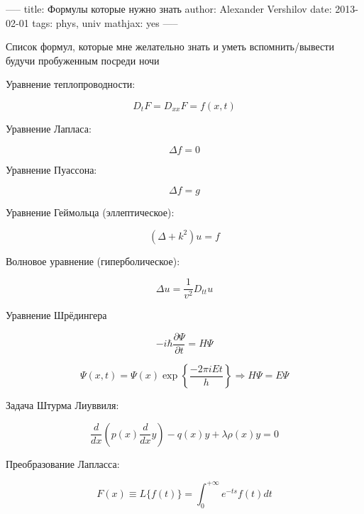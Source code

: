 -----
title: Формулы которые нужно знать
author: Alexander Vershilov
date: 2013-02-01
tags: phys, univ
mathjax: yes
-----


Список формул, которые мне желательно знать и уметь вспомнить/вывести будучи пробуженным посреди ночи

Уравнение теплопроводности:

$$ D_t F = D_{xx} F = f(x,t) $$

Уравнение Лапласа:

$$ \Delta f = 0 $$

Уравнение Пуассона:

$$ \Delta f = g $$

Уравнение Геймольца (эллептическое):

$$ (\Delta + k^2) u = f $$

Волновое уравнение (гиперболическое):

$$ \Delta u = \frac{1}{v^2} D_{tt} u $$

Уравнение Шрёдингера

$$ -i \hbar \frac{\partial \Psi}{\partial t} = H \Psi $$

$$ \Psi(x,t) = \Psi(x) \exp\left\{ \frac{-2\pi i E t}{h}\right\} \Rightarrow H\Psi = E\Psi$$

Задача Штурма Лиуввиля:

$$ \frac{d}{dx} \left( p(x) \frac{d}{dx} y \right) - q(x)y+\lambda\rho(x)y=0 $$

Преобразование Лапласса:

$$ F(x) \equiv L\{f(t)\} = \int_0^{+\infty}e^{-ts}f(t)dt$$





